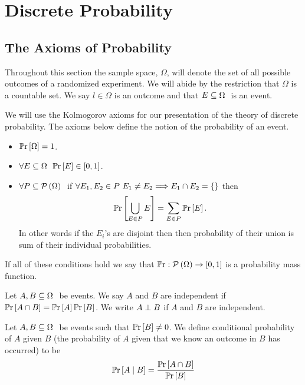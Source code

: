 

\chapter{Discrete Probability}
    \section{The Axioms of Probability}
        \begin{definition}
            Throughout this section the sample space, $\Omega$, will denote the set of
            all possible outcomes of a randomized experiment. We will abide by the restriction
            that $\Omega$ is a countable set. We say $l \in \Omega$ is an outcome and that
            $E \subseteq \Omega \ $ is an event.
        \end{definition}
        \begin{axiom}
            We will use the Kolmogorov axioms for our presentation of the theory of
            discrete probability. The axioms below define the notion of the probability
            of an event.
            \begin{itemize}
                \item
                    $\mathbb{P}\mathrm{r} \left[\Omega\right] = 1$.
                \item
                    $\forall E \subseteq \Omega \  \ \mathbb{P}\mathrm{r} \left[E\right] \in [0, 1]$.
                \item
                    $\forall P \subseteq \mathcal{P}\left(\Omega\right) \ $
                    if $\forall E_1, E_2 \in P  \ E_1 \neq E_2 \Longrightarrow E_1 \cap E_2 = \left\{\right\}$ then 
                    \[
                        \mathbb{P}\mathrm{r} \left[\displaystyle\bigcup_{E \in P} E\right] = \sum_{E \in P} \mathbb{P}\mathrm{r} \left[E\right].
                    \]
                    In other words if the $E_i$'s are disjoint then then probability of their
                    union is sum of their individual probabilities.
            \end{itemize}
            If all of these conditions hold we say that $\mathbb{P}\mathrm{r} : \mathcal{P}\left(\Omega\right) \rightarrow [0, 1]$
            is a probability mass function.
            \label{Axioms of Probability}
        \end{axiom}
        \begin{definition}
            Let $A, B \subseteq \Omega \ $ be events. We say $A$ and $B$ are independent if
            $\mathbb{P}\mathrm{r} \left[A \cap B\right] = \mathbb{P}\mathrm{r} \left[A\right]\mathbb{P}\mathrm{r} \left[B\right]$. We write $A \perp B$ if $A$ and $B$ are independent.
        \end{definition}
        \begin{definition}
            Let $A, B \subseteq \Omega \ $ be events such that $\mathbb{P}\mathrm{r} \left[B\right] \neq 0$. We define
            conditional probability of $A$ given $B$ (the probability of $A$ given that
            we know an outcome in $B$ has occurred) to be
            \[
                \mathbb{P}\mathrm{r}\left[A \mid B\right] = \frac{\mathbb{P}\mathrm{r} \left[A \cap B\right]}{\mathbb{P}\mathrm{r} \left[B\right]}
            \]
        \end{definition}
